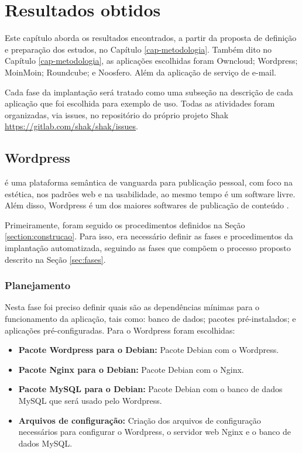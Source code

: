 \chapter{Resultados obtidos}
\label{cap-resultados}
Este capítulo aborda os resultados encontrados, a partir da proposta de
definição e preparação dos estudos, no Capítulo \ref{cap-metodologia}. Também dito 
no Capítulo \ref{cap-metodologia}, as aplicações escolhidas foram  
Owncloud; Wordpress; MoinMoin; Roundcube; e Noosfero. Além da aplicação de serviço
de e-mail.
 
Cada fase da implantação será tratado como uma 
subseção na descrição de cada aplicação que foi escolhida para exemplo de uso. 
Todas as atividades foram organizadas,
via issues, no repositório do próprio projeto Shak 
\url{https://gitlab.com/shak/shak/issues}.

\section{Wordpress}
\label{sub:wordpress}

 é uma plataforma semântica de vanguarda para publicação pessoal, 
com foco na estética, nos padrões web e na usabilidade, ao mesmo tempo é 
um software livre. Além disso, Wordpress é um dos maiores softwares de 
publicação de conteúdo . 

Primeiramente, foram seguido os procedimentos definidos na Seção 
\ref{section:construcao}. Para isso, era
necessário definir as fases e procedimentos da implantação automatizada,
seguindo as fases que compõem o processo proposto descrito na Seção \ref{sec:fases}.

\subsection{Planejamento}

Nesta fase foi preciso definir quais são as dependências mínimas
para o funcionamento da aplicação, tais como: banco de dados; pacotes
pré-instalados; e aplicações pré-configuradas. Para o Wordpress foram escolhidas:

\begin{itemize}
   \item \textbf{Pacote Wordpress para o Debian:} Pacote Debian com o Wordpress.
   \item \textbf{Pacote Nginx para o Debian:} Pacote Debian com o Nginx.
   \item \textbf{Pacote MySQL para o Debian:} Pacote Debian com o banco de dados MySQL
   que será usado pelo Wordpress.
   \item \textbf{Arquivos de configuração:} Criação dos arquivos de configuração
   necessários para configurar o Wordpress, o servidor web Nginx e o banco de dados
   MySQL.
\end{itemize}

